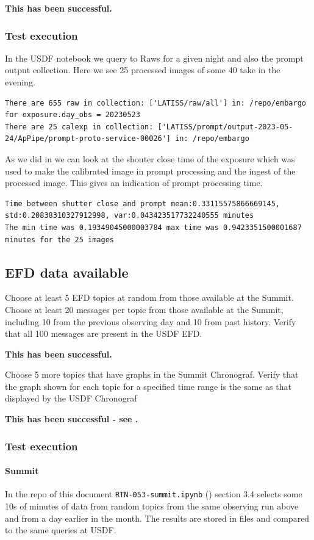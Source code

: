 \textbf{This has been successful.}
\subsubsection{Test execution}
In the USDF notebook we query to Raws for a given night and also the prompt output collection.
Here we see  25 processed images of some 40 take in the evening.

\begin{lstlisting}
There are 655 raw in collection: ['LATISS/raw/all'] in: /repo/embargo for exposure.day_obs = 20230523
There are 25 calexp in collection: ['LATISS/prompt/output-2023-05-24/ApPipe/prompt-proto-service-00026'] in: /repo/embargo
\end{lstlisting}

As we did in  we can look at the shouter close time of the exposure which was used to make the calibrated image in prompt processing and the ingest of the processed image.
This gives an indication of prompt processing time.
\begin{lstlisting}
Time between shutter close and prompt mean:0.33115575866669145, std:0.20838310327912998, var:0.043423517732240555 minutes
The min time was 0.19349045000003784 max time was 0.9423351500001687 minutes for the 25 images
\end{lstlisting}


\subsection{EFD data available }
Choose at least 5 EFD topics at random from those available at the Summit.
Choose at least 20 messages per topic from those available at the Summit, including 10 from the previous observing day and 10 from past history.
Verify that all 100 messages are present in the USDF EFD.

\textbf{This has been successful.}

Choose 5 more topics that have graphs in the Summit Chronograf. Verify that the graph
shown for each topic for a specified time range is the same as that displayed by the USDF
Chronograf

\textbf{This has been successful - see .}

\subsubsection{Test execution}

\paragraph{Summit} \label{sec:efdsummit}
In the repo of this document \texttt{RTN-053-summit.ipynb} ()  section 3.4
selects some 10s of minutes of data from random topics from the same observing run above and from a day earlier in the month.
The results are stored in files and compared to the same  queries at USDF.

